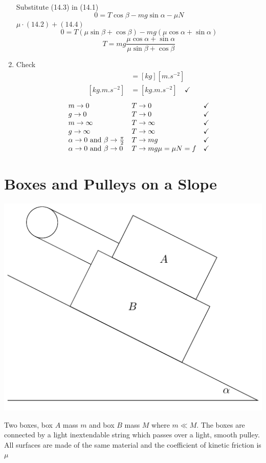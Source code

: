 \documentclass{article}
\begin{document}
\begin{enumerate}
Substitute (14.3) in (14.1)
\[0=T\cos\beta-mg\sin\alpha-\mu N\tag{14.4}\]
\(\mu\cdot(14.2)+(14.4)\)
\[0=T(\mu\sin\beta+\cos\beta)-mg(\mu\cos\alpha+\sin\alpha)\]
\[T=mg\frac{\mu\cos\alpha+\sin\alpha}{\mu\sin\beta+\cos\beta}\]
\item Check
\begin{align*}
[\si{N}]&=[\si{kg}][\si{m.s^{-2}}]\\
[\si{kg.m.s^{-2}}]&=[\si{kg.m.s^{-2}}]\quad\checkmark
\end{align*}
\[
\begin{array}{l l l}
m\to 0 & T\to 0 & \checkmark\\
g\to 0 & T\to 0 & \checkmark\\
m\to \infty & T\to\infty & \checkmark\\
g \to \infty & T\to\infty & \checkmark\\
\alpha \to 0\text{ and }\beta\to \frac{\pi}{2} & T\to mg & \checkmark\\
\alpha\to 0\text{ and }\beta\to 0 & T\to mg\mu=\mu N=f&\checkmark\\
\end{array}
\]
\end{enumerate}

\section{Boxes and Pulleys on a Slope}

\begin{center}
\includegraphics[scale=0.4]{BothBoxes}
\end{center}
Two boxes, box \(A\) mass \(m\) and box \(B\) mass \(M\) where \(m\ll M\). The boxes are connected by a light inextendable string which passes over a light, smooth pulley. All surfaces are made of the same material and the coefficient of kinetic friction is \(\mu\)
\end{document}

